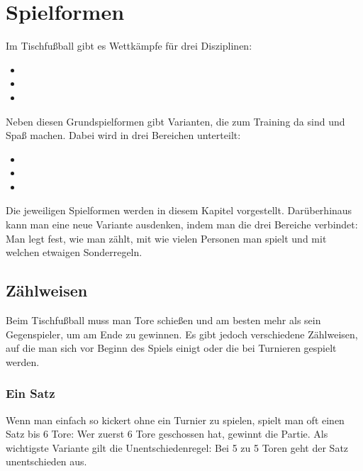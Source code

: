 \chapter{Spielformen}
\label{spielformen}

Im Tischfußball gibt es Wettkämpfe für drei Disziplinen: 
\begin{itemize}
\item {}
\item {}
\item {}
\end{itemize}
Neben diesen Grundspielformen gibt Varianten, die zum Training da sind und Spaß machen. Dabei wird in drei Bereichen unterteilt:
\begin{itemize}
\item {}
\item {}
\item {}
\end{itemize}
Die jeweiligen Spielformen werden in diesem Kapitel vorgestellt. Darüberhinaus kann man eine neue Variante ausdenken, indem man die drei Bereiche verbindet: Man legt fest, wie man zählt, mit wie vielen Personen man spielt und mit welchen etwaigen Sonderregeln.


\section{Zählweisen}
\label{spielformen:zaehlweisen}

Beim Tischfußball muss man Tore schießen und am besten mehr als sein Gegenspieler, um am Ende zu gewinnen.
Es gibt jedoch verschiedene Zählweisen, auf die man sich vor Beginn des Spiels einigt oder die bei Turnieren gespielt werden. 

\subsection{Ein Satz}
\label{spielformen:zaehlweisen:einsatz}

Wenn man einfach so kickert ohne ein Turnier zu spielen, spielt man oft einen Satz bis 6 Tore: Wer zuerst 6 Tore geschossen hat, gewinnt die Partie.
Als wichtigste Variante gilt die Unentschiedenregel: Bei 5 zu 5 Toren geht der Satz unentschieden aus.

